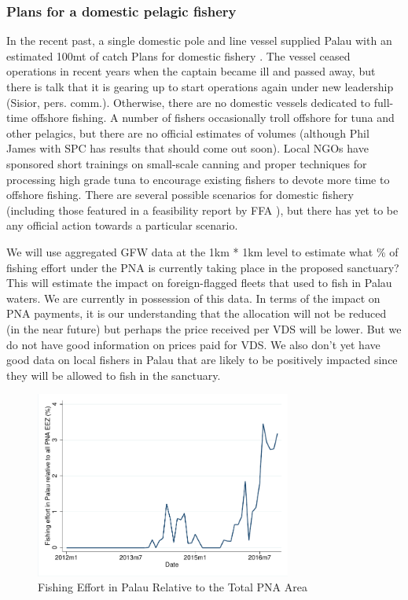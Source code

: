 \documentclass[9pttwoside,lineno]{pnas-new}
\begin{document}
%

\subsubsection{Plans for a domestic pelagic fishery}

In the recent past, a single domestic pole and line vessel supplied Palau with an estimated 100mt of catch Plans for domestic fishery \citep{Gillett2016}. The vessel ceased operations in recent years when the captain became ill and passed away, but there is talk that it is gearing up to start operations again under new leadership (Sisior, pers. comm.). Otherwise, there are no domestic vessels dedicated to full-time offshore fishing. A number of fishers occasionally troll offshore for tuna and other pelagics, but there are no official estimates of volumes (although Phil James with SPC has results that should come out soon). 
Local NGOs have sponsored short trainings on small-scale canning and proper techniques for processing high grade tuna to encourage existing fishers to devote more time to offshore fishing. There are several possible scenarios for domestic fishery (including those featured in a feasibility report by FFA \citep{Skirtun2017}), but there has yet to be any official action towards a particular scenario. 
 

We will use aggregated GFW data at the 1km * 1km level to estimate what \% of fishing effort under the PNA is currently taking place in the proposed sanctuary? This will estimate the impact on foreign-flagged fleets that used to fish in Palau waters. We are currently in possession of this data. In terms of the impact on PNA payments, it is our understanding that the allocation will not be reduced (in the near future) but perhaps the price received per VDS will be lower. But we do not have good information on prices paid for VDS. We also don’t yet have good data on local fishers in Palau that are likely to be positively impacted since they will be allowed to fish in the sanctuary. 

\begin{figure}[h]
	\includegraphics[width=0.75\textwidth]{img/Fishing_effort_Palau_relative_PNA}
	\caption{Fishing Effort in Palau Relative to the Total PNA Area}
\end{figure}
\end{document}
